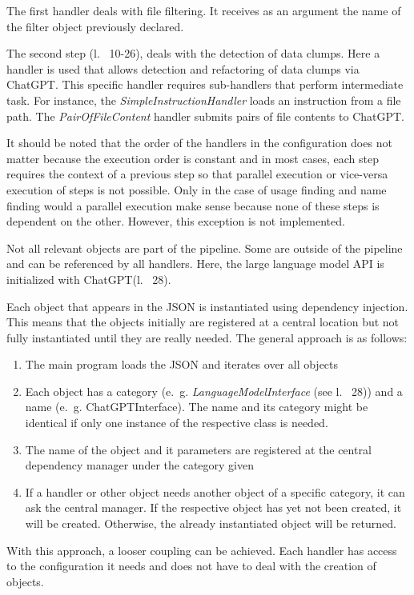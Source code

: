 The first handler deals with file filtering. It receives as an argument the name of the filter object previously declared. 

The second step (l.~ 10-26), deals with the detection of data clumps. Here a handler is used that allows detection and refactoring of data clumps via ChatGPT. This specific handler requires sub-handlers that perform intermediate task. For instance, the \textit{SimpleInstructionHandler} loads an instruction from a file path. The \textit{PairOfFileContent} handler submits pairs of file contents to ChatGPT.

It should be noted that the order of the handlers in the configuration  does not matter because the execution order is constant and in most cases, each step requires the context of a previous step so that parallel execution or vice-versa execution of steps is not possible. Only in the case of usage finding and name finding would a parallel execution make sense because none of these steps is dependent on the other.  However, this exception is not implemented.

Not all relevant objects are part of the pipeline. Some are outside of the pipeline and can be referenced by all handlers. Here, the large language model \ac{API} is initialized with ChatGPT(l.~ 28).

Each object that appears in the \ac{JSON} is instantiated using dependency injection. This means that the objects initially are registered at a central location but not fully instantiated until they are really needed. The general approach is as follows:
\begin{enumerate}
    \item The main program loads the \ac{JSON} and iterates over all objects
    \item Each object has a category (e.~g. \textit{LanguageModelInterface} (see l.~ 28)) and a name (e.~g. ChatGPTInterface). The name and its category might be identical if only one instance of the respective class is needed. 
    \item The name of the object and it parameters are registered at the central dependency manager under the category given
    \item If a handler or other object needs another object of a specific category, it can ask the central manager. If the respective object has  yet not been created, it will be created. Otherwise, the already instantiated object will be returned. 
\end{enumerate}
With this approach, a looser coupling can be achieved. Each handler has access to the configuration it needs and does not have to deal with the creation of objects. 
